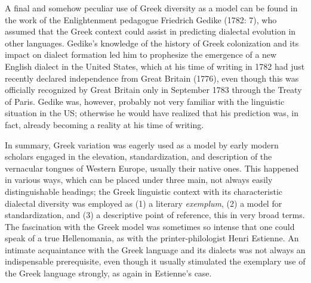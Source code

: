 \begin{styleStandard}
A final and somehow peculiar use of Greek diversity as a model can be found in the work of the Enlightenment pedagogue Friedrich Gedike (1782: 7), who assumed that the Greek context could assist in predicting dialectal evolution in other languages. Gedike’s knowledge of the history of Greek colonization and its impact on dialect formation led him to prophesize the emergence of a new English dialect in the United States, which at his time of writing in 1782 had just recently declared independence from Great Britain (1776), even though this was officially recognized by Great Britain only in September 1783 through the Treaty of Paris. Gedike was, however, probably not very familiar with the linguistic situation in the US; otherwise he would have realized that his prediction was, in fact, already becoming a reality at his time of writing.
\end{styleStandard}

\begin{styleStandard}
In summary, Greek variation was eagerly used as a model by early modern scholars engaged in the elevation, standardization, and description of the vernacular tongues of Western Europe, usually their native ones. This happened in various ways, which can be placed under three main, not always easily distinguishable headings; the Greek linguistic context with its characteristic dialectal diversity was employed as (1) a literary \textit{exemplum}, (2) a model for standardization, and (3) a descriptive point of reference, this in very broad terms. The fascination with the Greek model was sometimes so intense that one could speak of a true Hellenomania, as with the printer-philologist Henri Estienne. An intimate acquaintance with the Greek language and its dialects was not always an indispensable prerequisite, even though it usually stimulated the exemplary use of the Greek language strongly, as again in Estienne’s case.
\end{styleStandard}

